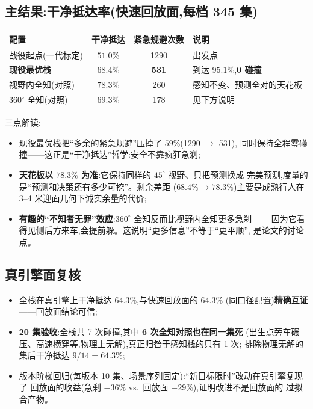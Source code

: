\documentclass[11pt]{ctexart}
\begin{document}
\subsection{主结果:干净抵达率(快速回放面,每档 345 集)}

\begin{center}
\begin{tabular}{@{}lccl@{}}
\toprule
配置 & 干净抵达 & 紧急规避次数 & 说明 \\
\midrule
战役起点(一代标定) & $51.0\%$ & 1290 & 出发点 \\
\textbf{现役最优栈} & $\mathbf{68.4\%}$ & \textbf{531} & 到达 $95.1\%$,\textbf{0 碰撞} \\
视野内全知(对照) & $78.3\%$ & 260 & 感知不变、预测全对的天花板 \\
$360^\circ$ 全知(对照) & $69.3\%$ & 178 & 见下方说明 \\
\bottomrule
\end{tabular}
\end{center}

三点解读:
\begin{itemize}
  \item 现役最优栈把``多余的紧急规避''压掉了 $59\%$(1290 $\to$ 531),
        同时保持全程零碰撞——这正是``干净抵达''哲学:安全不靠疯狂急刹;
  \item \textbf{天花板以 $78.3\%$ 为准}:它保持同样的 $45^\circ$ 视野、只把预测换成
        完美预测,度量的是``预测和决策还有多少可挖''。剩余差距
        ($68.4\% \to 78.3\%$)主要是成熟行人在 3--4 米迎面几何下诚实余量的代价;
  \item \textbf{有趣的``不知者无罪''效应}:$360^\circ$ 全知反而比视野内全知更多急刹
        ——因为它看得见侧后方来车,会提前躲。这说明``更多信息''不等于``更平顺'',
        是论文的讨论点。
\end{itemize}

\subsection{真引擎面复核}

\begin{itemize}
  \item 全栈在真引擎上干净抵达 $64.3\%$,与快速回放面的 $64.3\%$
        (同口径配置)\textbf{精确互证}——回放面结论可信;
  \item \textbf{20 集验收}:全栈共 7 次碰撞,其中 \textbf{6 次全知对照也在同一集死}
        (出生点旁车碾压、高速横穿等,物理上无解),真正归咎于感知栈的只有 1 次;
        排除物理无解的集后干净抵达 $9/14 = 64.3\%$;
  \item 版本阶梯回归(每版本 10 集、场景序列固定):``新目标限时''改动在真引擎复现了
        回放面的收益(急刹 $-36\%$ vs.\ 回放面 $-29\%$),证明改进不是回放面的
        过拟合产物。
\end{itemize}
\end{document}
